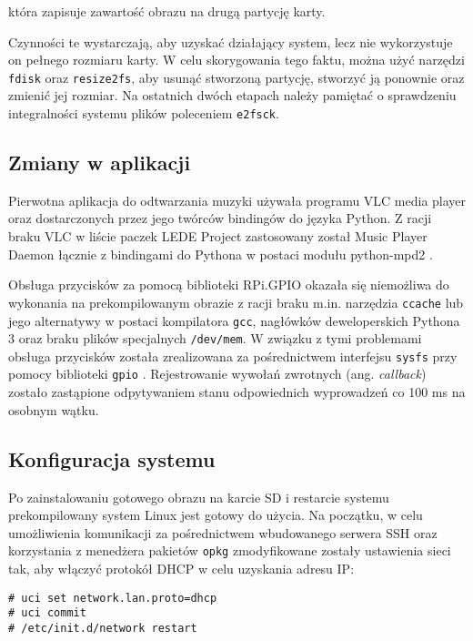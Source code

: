 \documentclass[10pt,a4paper]{article}
\begin{document}
która zapisuje zawartość obrazu na drugą partycję karty.

Czynności te wystarczają, aby uzyskać działający system, lecz nie wykorzystuje on pełnego rozmiaru
karty. W celu skorygowania tego faktu, można użyć narzędzi \texttt{fdisk} oraz \texttt{resize2fs},
aby usunąć stworzoną partycję, stworzyć ją ponownie oraz zmienić jej rozmiar. Na ostatnich dwóch
etapach należy pamiętać o sprawdzeniu integralności systemu plików poleceniem \texttt{e2fsck}.

\subsection{Zmiany w aplikacji}

Pierwotna aplikacja do odtwarzania muzyki używała programu VLC media player oraz dostarczonych
przez jego twórców bindingów do języka Python. Z racji braku VLC w liście paczek LEDE Project
zastosowany został Music Player Daemon \cite{mpd} łącznie z bindingami do Pythona w postaci
modułu python-mpd2 \cite{python-mpd2}.

Obsługa przycisków za pomocą biblioteki RPi.GPIO okazała się niemożliwa do wykonania
na prekompilowanym obrazie z racji braku m.in. narzędzia \texttt{ccache} lub jego alternatywy
w postaci kompilatora \texttt{gcc}, nagłówków deweloperskich Pythona 3 oraz braku plików
specjalnych \texttt{/dev/mem}. W związku z tymi problemami obsługa przycisków została zrealizowana
za pośrednictwem interfejsu \texttt{sysfs} przy pomocy biblioteki \texttt{gpio} \cite{gpio}.
Rejestrowanie wywołań zwrotnych (ang. \emph{callback}) zostało zastąpione odpytywaniem stanu
odpowiednich wyprowadzeń co 100 ms na osobnym wątku.

\subsection{Konfiguracja systemu}

Po zainstalowaniu gotowego obrazu na karcie SD i restarcie systemu prekompilowany system Linux
jest gotowy do użycia. Na początku, w celu umożliwienia komunikacji za pośrednictwem wbudowanego
serwera SSH oraz korzystania z menedżera pakietów \texttt{opkg} zmodyfikowane zostały ustawienia
sieci tak, aby włączyć protokół DHCP w celu uzyskania adresu IP:

\begin{lstlisting}[caption=Włączanie klienta DHCP na interfejsie \texttt{lan}]
# uci set network.lan.proto=dhcp
# uci commit
# /etc/init.d/network restart
\end{lstlisting}
\end{document}
